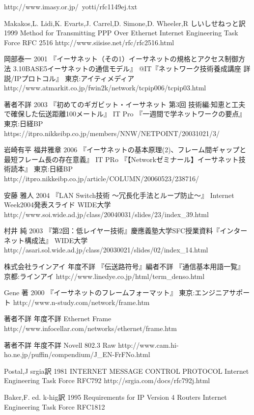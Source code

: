 \begin{thebibliography}{99}
	http://www.imasy.or.jp/~yotti/rfc1149ej.txt
\item
     Makakos,L. Lidi,K. Evarts,J. Carrel,D. Simone,D. Wheeler,R
	しいしせねっと訳
	1999
	Method for Transmitting PPP Over Ethernet Internet Engineering Task Force RFC 2516
     http://www.siisise.net/rfc/rfc2516.html
\item
     岡部泰一
	2001
	『イーサネット（その1）イーサネットの規格とアクセス制御方法 3.10BASE5イーサネットの通信モデル』 @IT『ネットワーク技術養成講座 詳説/IPプロトコル』 
	東京:アイティメディア
     http://www.atmarkit.co.jp/fwin2k/network/tcpip006/tcpip03.html
\item
     著者不詳
	2003
	『初めてのギガビット・イーサネット 第3回 技術編:知恵と工夫で確保した伝送距離100メートル』 IT Pro 『一週間で学ネットワークの要点』
	東京:日経BP
     https://itpro.nikkeibp.co.jp/members/NNW/NETPOINT/20031021/3/
\item
    岩崎有平 福井雅章
	2006
	『イーサネットの基本原理(2)、フレーム間ギャップと最短フレーム長の存在意義』 IT PRo 『【Networkゼミナール】イーサネット技術読本』
	東京:日経BP
     http://itpro.nikkeibp.co.jp/article/COLUMN/20060523/238716/
\item
     安藤 雅人
	2004
	『LAN Switch技術 ～冗長化手法とループ防止～』 Internet Week2004発表スライド
	WIDE大学
     http://www.soi.wide.ad.jp/class/20040031/slides/23/index\_39.html
\item
     村井 純
	2003
	『第2回：低レイヤー技術』慶應義塾大学SFC授業資料『インターネット構成法』
	WIDE大学
     http://asari.sol.wide.ad.jp/class/20030021/slides/02/index\_14.html
\item
     株式会社ラインアイ
	年度不詳
	『伝送路符号』編者不詳 『通信基本用語一覧』
	京都:ラインアイ
     http://www.linedye.co.jp/html/term\_denso.html
\item
	Gene 著
	2000
	『イーサネットのフレームフォーマット』
	東京:エンジニアサポート
	http://www.n-study.com/network/frame.htm
\item
	著者不詳
	年度不詳
	Ethernet Frame
	http://www.infocellar.com/networks/ethernet/frame.htm
\item
	著者不詳
	年度不詳
	Novell 802.3 Raw
	http://www.cam.hi-ho.ne.jp/puffin/compendium/J\_EN-FrFNo.html
\item
      Postal,J
	srgia訳
	1981
	INTERNET MESSAGE CONTROL PROTOCOL Internet Engineering Task Force RFC792
     http://srgia.com/docs/rfc792j.html
\item
      Baker,F. ed. 
	k-hig訳
	1995
	Requirements for IP Version 4 Routers Internet Engineering Task Force RFC1812

\end{thebibliography}
